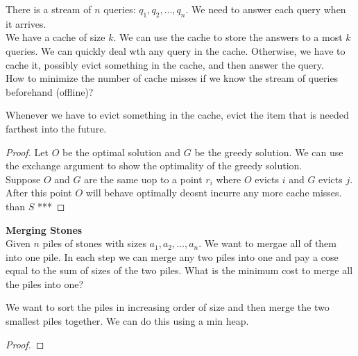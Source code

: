 \documentclass[answers,12pt,addpoints]{exam}
\begin{document}
\begin{questions}
There is a stream of $n$ queries: $q_1, q_2, \dots, q_n$. We need to answer each query when it arrives.\\
We have a cache of size $k$. We can use the cache to store the answers to a most $k$ queries. We can quickly deal wth any query in the cache. Otherwise, we have to cache it, possibly evict something in the cache, and then answer the query.\\
How to minimize the number of cache misses if we know the stream of queries beforehand (offline)?
\begin{solution}
    Whenever we have to evict something in the cache, evict the item that is needed farthest into the future. 
    \begin{proof}
        Let $O$ be the optimal solution and $G$ be the greedy solution. We can use the exchange argument to show the optimality of the greedy solution.\\
        Suppose $O$ and $G$ are the same uop to a point $r_i$ where $O$ evicts $i$ and $G$ evicts $j$. After this point $O$ will behave optimally deosnt incurre any more cache misses. than $S$ ***
    \end{proof}
\end{solution}
\question\textbf{Merging Stones}\\
Given $n$ piles of stones with sizes $a_1, a_2, \dots, a_n$. We want to mergae all of them into one pile. In each step we can merge any two piles into one and pay a cose equal to the sum of sizes of the two piles. What is the minimum cost to merge all the piles into one?
\begin{solution}
    We want to sort the piles in increasing order of size and then merge the two smallest piles together. We can do this using a min heap.
    \begin{proof}
        
    \end{proof}
\end{solution}




\end{questions}
\end{document}
